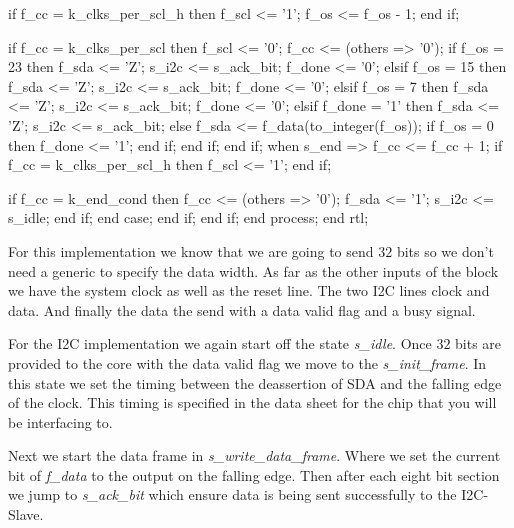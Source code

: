 \begin{VHDLlisting}[tabsize=4]
                        if f_cc = k_clks_per_scl_h then
                            f_scl <= '1';
                            f_os <= f_os - 1;
                        end if; 
						
                        if f_cc = k_clks_per_scl then
							f_scl <= '0';
                            f_cc <= (others => '0');
							if f_os = 23 then
								f_sda <= 'Z';
								s_i2c <= s_ack_bit;
								f_done <= '0';
                            elsif f_os = 15 then
								f_sda <= 'Z';
								s_i2c <= s_ack_bit;
								f_done <= '0';
                            elsif f_os = 7 then
								f_sda <= 'Z';
								s_i2c <= s_ack_bit;
								f_done <= '0';
                            elsif f_done = '1' then
								f_sda <= 'Z';
                                s_i2c <= s_ack_bit;
							else
								f_sda <= f_data(to_integer(f_os));
								if f_os = 0 then
									f_done <= '1';
								end if;
                            end if;
                        end if;
					when s_end =>
						f_cc <= f_cc + 1;
						if f_cc = k_clks_per_scl_h then
                            f_scl <= '1';
                        end if; 
						
                        if f_cc = k_end_cond then
                            f_cc <= (others => '0');
							f_sda <= '1';
							s_i2c <= s_idle;
                        end if;
                end case;
            end if;
        end if;
    end process;
end rtl;
\end{VHDLlisting}

For this implementation we know that we are going to send $32$ bits so we don't need a generic to specify the data width. As far as the other inputs of the block we have the system clock as well as the reset line. The two \ac{I2C} lines clock and data. And finally the data the send with a data valid flag and a busy signal. 

For the \ac{I2C} implementation we again start off the state \emph{s\_idle}. Once $32$ bits are provided to the core with the data valid flag we move to the \emph{s\_init\_frame}. In this state we set the timing between the deassertion of SDA and the falling edge of the clock. This timing is specified in the data sheet for the chip that you will be interfacing to. 

Next we start the data frame in \emph{s\_write\_data\_frame}. Where we set the current bit of \emph{f\_data} to the output on the falling edge. Then after each eight bit section we jump to \emph{s\_ack\_bit} which ensure data is being sent successfully to the \ac{I2C}-Slave.

